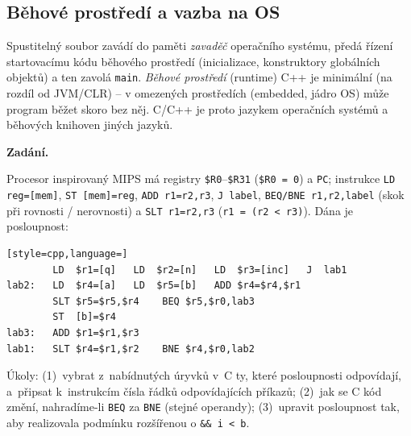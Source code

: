 \documentclass[11pt,a4paper]{article}
\newcommand{\cd}{\lstinline[style=cpp]}
\begin{document}
\subsection{Běhové prostředí a vazba na OS}

\begin{poznamka}
Spustitelný soubor zavádí do paměti \emph{zavaděč} operačního systému, předá řízení startovacímu kódu běhového prostředí (inicializace, konstruktory globálních objektů) a ten zavolá \cd{main}. \emph{Běhové prostředí} (runtime) C++ je minimální (na rozdíl od JVM/CLR) -- v omezených prostředích (embedded, jádro OS) může program běžet skoro bez něj. C/C++ je proto jazykem operačních systémů a běhových knihoven jiných jazyků.
\end{poznamka}

\begin{priklad}
\par

\textbf{Zadání.}\par
Procesor inspirovaný MIPS má registry \texttt{\$R0}--\texttt{\$R31}
(\texttt{\$R0 = 0}) a \texttt{PC}; instrukce \texttt{LD reg=[mem]},
\texttt{ST [mem]=reg}, \texttt{ADD r1=r2,r3}, \texttt{J label},
\texttt{BEQ/BNE r1,r2,label} (skok při rovnosti / nerovnosti) a
\texttt{SLT r1=r2,r3} (\texttt{r1 = (r2 < r3)}). Dána je posloupnost:

\begin{lstlisting}[style=cpp,language=]
        LD  $r1=[q]   LD  $r2=[n]   LD  $r3=[inc]   J  lab1
lab2:   LD  $r4=[a]   LD  $r5=[b]   ADD $r4=$r4,$r1
        SLT $r5=$r5,$r4    BEQ $r5,$r0,lab3
        ST  [b]=$r4
lab3:   ADD $r1=$r1,$r3
lab1:   SLT $r4=$r1,$r2    BNE $r4,$r0,lab2
\end{lstlisting}
Úkoly: (1)~vybrat z~nabídnutých úryvků v~C ty, které posloupnosti odpovídají, a~připsat k~instrukcím čísla řádků odpovídajících příkazů;
(2)~jak se C kód změní, nahradíme-li \texttt{BEQ} za \texttt{BNE} (stejné operandy);
(3)~upravit posloupnost tak, aby realizovala podmínku rozšířenou o \texttt{\&\& i < b}.


\end{priklad}
\end{document}
